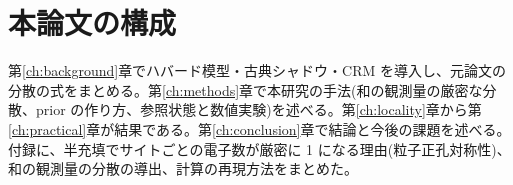 \section{本論文の構成}

第\ref{ch:background}章でハバード模型・古典シャドウ・CRM を導入し、元論文の分散の式をまとめる。第\ref{ch:methods}章で本研究の手法(和の観測量の厳密な分散、prior の作り方、参照状態と数値実験)を述べる。第\ref{ch:locality}章から第\ref{ch:practical}章が結果である。第\ref{ch:conclusion}章で結論と今後の課題を述べる。付録に、半充填でサイトごとの電子数が厳密に 1 になる理由(粒子正孔対称性)、和の観測量の分散の導出、計算の再現方法をまとめた。
